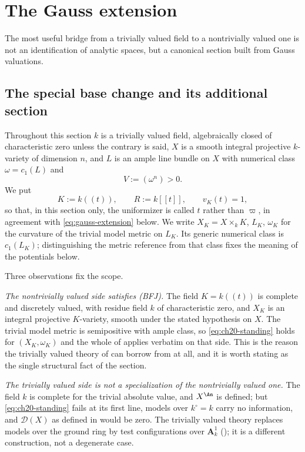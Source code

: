 \section{The Gauss extension}
\label{sec:ch30-gauss}

The most useful bridge from a trivially valued field to a nontrivially
valued one is not an identification of analytic spaces, but a canonical
section built from Gauss valuations.

\subsection{The special base change and its additional section}
\label{sec:ch30-gauss-setting}

Throughout this section $k$ is a trivially valued field, algebraically
closed of characteristic zero unless the contrary is said, $X$ is a smooth integral projective $k$-variety of dimension $n$,
and $L$ is an ample
line bundle on $X$ with numerical class $\omega=c_1(L)$ and
\[
                       V:=(\omega^n)>0 .
\]
We put
\[
 K:=k(\!(t)\!),\qquad R:=k[\![t]\!],\qquad v_K(t)=1,
\]
so that, in this section only, the uniformizer is called $t$ rather than
$\varpi$, in agreement with \eqref{eq:gauss-extension} below.  We write
$X_K=X\times_kK$, $L_K$, $\omega_K$ for the curvature of the trivial model metric on $L_K$.
Its generic numerical class is $c_1(L_K)$; distinguishing the metric
reference from that class fixes the meaning of the potentials below.

Three observations fix the scope.

\emph{The nontrivially valued side satisfies \textup{(BFJ)}.}  The field
$K=k(\!(t)\!)$ is complete and discretely valued, with residue field
$k$ of characteristic zero, and $X_K$ is an integral projective
$K$-variety, smooth under the stated hypothesis on $X$.  The trivial
model metric is semipositive with ample class, so
\eqref{eq:ch20-standing} holds for
$(X_K,\omega_K)$ and the whole of
 applies verbatim on
that side.  This is the reason the trivially valued theory of
 can borrow from  at all, and it is worth
stating as the single structural fact of the section.

\emph{The trivially valued side is not a specialization of the
nontrivially valued one.}  The field $k$ is complete for the trivial
absolute value, and $X^{\An}$ is defined; but \eqref{eq:ch20-standing}
fails at its first line, models over $k^\circ=k$ carry no information,
and $\mathcal D(X)$ as defined in  would be
zero.  The trivially valued theory replaces models over the ground ring by
test configurations over $\mathbf A^1_k$
(); it is a different construction, not a
degenerate case.

